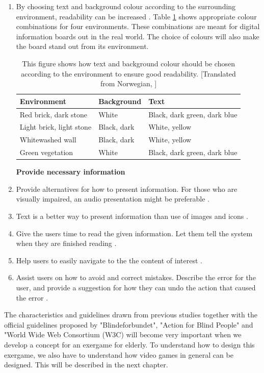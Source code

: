 \begin{enumerate}[{g}.1]
\item By choosing text and background colour according to the surrounding environment, readability can be increased \cite{blindeforbundetTekst}. Table \ref{tab:contrastenvironment} shows appropriate colour combinations for four environments. These combinations are meant for digital information boards out in the real world. The choice of colours will also make the board stand out from its environment.  

\begin{table} [ht!]
\centering
    \begin{tabular}{|p{}|p{}|p{}|}
       \hline
       \textbf{Environment} & \textbf{Background} & \textbf{Text} \\ \hline
		Red brick, dark stone & White & Black, dark green, dark blue \\ \hline
		Light brick, light stone & Black, dark & White, yellow \\ \hline
		Whitewashed wall & Black, dark & White, yellow \\ \hline
		Green vegetation & White & Black, dark green, dark blue \\ \hline
    \end{tabular}
    \caption[Colours and contrasts - environment]{This figure shows how text and background colour should be chosen according to the environment to ensure good readability. [Translated from Norwegian, \cite{blindeforbundetTekst}]}
    \label{tab:contrastenvironment}
\end{table} 


\textbf{Provide necessary information}
\item Provide alternatives for how to present information. For those who are visually impaired, an audio presentation might be preferable \cite{blindeforbundetTekst} \cite{w3cTekst}. 
\item Text is a better way to present information than use of images and icons \cite{w3cTekst}.
\item Give the users time to read the given information. Let them tell the system when they are finished reading \cite{w3cTekst}.  
\item Help users to easily navigate to the the content of interest \cite{w3cTekst}.
\item Assist users on how to avoid and correct mistakes. Describe the error for the user, and provide a suggestion for how they can undo the action that caused the error \cite{w3cTekst}.      
\end{enumerate} 

The characteristics and guidelines drawn from previous studies together with the official guidelines proposed by "Blindeforbundet", "Action for Blind People" and "World Wide Web Consortium (W3C) will become very important  when we develop a concept for an exergame for elderly. To understand how to design this exergame, we also have to understand how video games in general can be designed. This will be described in the next chapter.




